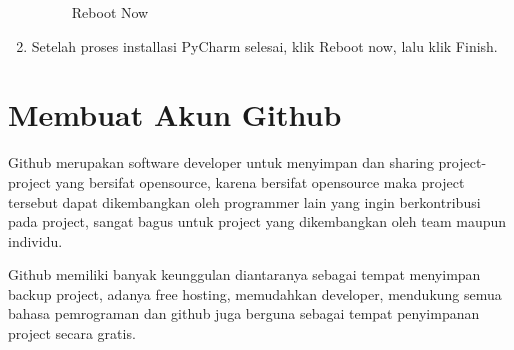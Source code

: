 \begin{enumerate}
\begin{figure}[H]
\caption{Reboot Now}
\label{installpycharm6}
\end{figure}
\item Setelah proses installasi PyCharm selesai, klik Reboot now, lalu klik Finish.
\end{enumerate}

\section{Membuat Akun Github}
Github merupakan software developer untuk menyimpan dan sharing project-project yang bersifat opensource, karena bersifat opensource maka project tersebut dapat dikembangkan oleh programmer lain yang ingin berkontribusi pada project, sangat bagus untuk project yang dikembangkan oleh team maupun individu. 

Github memiliki banyak keunggulan diantaranya sebagai tempat menyimpan backup project, adanya free hosting, memudahkan developer, mendukung semua bahasa pemrograman dan github juga berguna sebagai tempat penyimpanan project secara gratis.

